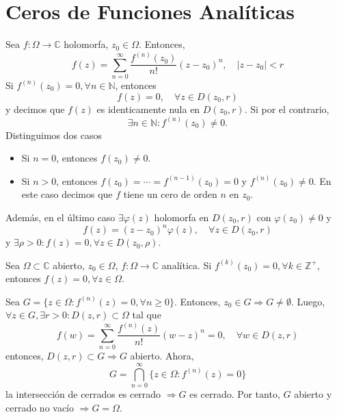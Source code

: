 \section{Ceros de Funciones Analíticas}

\begin{defn}
  Sea $f : \Omega \to \mathbb{C}$ holomorfa, $z_{0} \in \Omega$. Entonces,
  \[ 
    f(z) = \sum_{n = 0}^{\infty} \frac{f^{(n)}(z_{0})}{n!}(z-z_{0})^{n}, \quad | z - z_{0} | < r
  \] 
  Si $f^{(n)}(z_{0}) = 0, \forall n \in \mathbb{N}$, entonces
  \[
    f(z) = 0, \quad \forall z \in D(z_{0}, r)
  \]
  y decimos que $f(z)$ es identicamente nula en $D(z_{0}, r)$. Si por el contrario,
  \[
    \exists n \in \mathbb{N} : f^{(n)}(z_{0}) \neq 0.
  \]
  Distinguimos dos casos
  \begin{itemize}
    \item Si $ n = 0$, entonces $f(z_{0}) \neq 0$.
    \item Si $n>0$, entonces $f(z_0) = \cdots = f^{(n-1)}(z_0) = 0$ y $f^{(n)}(z_{0}) \neq 0$. En este caso decimos que $f$ tiene un cero de orden $n$ en $z_{0}$.
  \end{itemize}
  Además, en el último caso $\exists \varphi(z)$ holomorfa en $D(z_{0},r)$ con $\varphi(z_{0}) \neq 0$ y 
  \[ 
    f(z) = (z - z_{0})^{n} \varphi(z), \quad \forall z \in D(z_{0}, r)
  \] 
  y $\exists \rho > 0 : f(z) = 0, \forall z \in D(z_{0}, \rho)$.
\end{defn}

\begin{cor}
  Sea $\Omega \subset \mathbb{C}$ abierto, $z_{0} \in \Omega$, $f : \Omega \to \mathbb{C}$ analítica. Si $f^{(k)}(z_{0}) = 0, \forall k \in \mathbb{Z}^{+}$, entonces $f(z) = 0, \forall z \in \Omega$.
\end{cor}

\begin{dem}
  Sea $G = \{  z \in \Omega : f^{(n)}(z) = 0, \forall n \geq 0 \}$. Entonces, $z_{0} \in G \Rightarrow G \neq \emptyset$. Luego, $\forall z \in G, \exists r > 0 : D(z, r) \subset \Omega$ tal que 
  \[ 
    f(w) = \sum_{n = 0}^{\infty} \frac{f^{(n)}(z)}{n!}(w - z)^{n} = 0, \quad \forall w \in D(z, r) 
  \] 
  entonces, $D(z, r) \subset G \Rightarrow G$ abierto. Ahora, 
  \[ 
    G = \bigcap_{n = 0}^{\infty} \{ z \in \Omega : f^{(n)}(z) = 0 \}
  \] 
  la intersección de cerrados es cerrado $\Rightarrow G$ es cerrado. Por tanto, $G$ abierto y cerrado no vacío $\Rightarrow G = \Omega$.
\end{dem}

